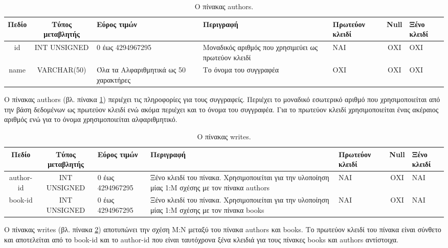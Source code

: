 \documentclass{assignment}
\begin{document}
\begin{landscape}
\begin{table}[htbp]
\begin{center}
  \begin{tabular}{|c|c|m{}|m{}|m{2.0cm}|c|m{1.5cm}|}
    \hline
    {\bf Πεδίο} & {\bf Τύπος μεταβλητής} & {\bf Εύρος τιμών} & {\bf Περιγραφή} & {\bf Πρωτεύον κλειδί} & {\bf Null} & {\bf Ξένο κλειδί} \\ \hline
    id & INT UNSIGNED & 0 έως 4294967295 & Μοναδικός αριθμός που χρησιμεύει ως πρωτεύον κλειδί & ΝΑΙ & ΟΧΙ & ΟΧΙ \\ \hline
    name & VARCHAR(50) & Όλα τα Αλφαριθμητικά ως 50 χαρακτήρες & Το όνομα του συγγραφέα & ΟΧΙ & ΟΧΙ & ΟΧΙ \\ \hline
  \end{tabular}
\caption{Ο πίνακας authors.}
\label{table:db_table:authors}
\end{center}
\end{table}

Ο πίνακας authors (βλ. πίνακα \ref{table:db_table:authors}) περιέχει τις πληροφορίες για τους συγγραφείς. Περιέχει το μοναδικό εσωτερικό αριθμό που χρησιμοποιείται από την βάση δεδομένων ως πρωτεύον κλειδί ενώ ακόμα περιέχει και το όνομα του συγγραφέα. Για το πρωτεύον κλειδί χρησιμοποιείται ένας ακέραιος αριθμός ενώ για το όνομα χρησιμοποιείται αλφαριθμητικό.
\\

\begin{table}[htbp]
\begin{center}
  \begin{tabular}{|c|c|m{}|m{}|m{2.0cm}|c|m{1.5cm}|}
    \hline
    {\bf Πεδίο} & {\bf Τύπος μεταβλητής} & {\bf Εύρος τιμών} & {\bf Περιγραφή} & {\bf Πρωτεύον κλειδί} & {\bf Null} & {\bf Ξένο κλειδί} \\ \hline
    author-id & INT UNSIGNED & 0 έως 4294967295 & Ξένο κλειδί του πίνακα. Χρησιμοποιείται για την υλοποίηση μίας 1:Μ σχέσης με τον πίνακα authors & ΝΑΙ & ΟΧΙ & NAI \\ \hline
    book-id & INT UNSIGNED & 0 έως 4294967295 & Ξένο κλειδί του πίνακα. Χρησιμοποιείται για την υλοποίηση μίας 1:Μ σχέσης με τον πίνακα books & ΝΑΙ & ΟΧΙ & NAI \\ \hline
  \end{tabular}
\caption{Ο πίνακας writes.}
\label{table:db_table:writes}
\end{center}
\end{table}

Ο πίνακας writes (βλ. πίνακα \ref{table:db_table:writes}) αποτυπώνει την σχέση Μ:Ν μεταξύ του πίνακα authors και books. Το πρωτεύον κλειδί του πίνακα είναι σύνθετο και αποτελείται από το book-id και το author-id που είναι ταυτόχρονα ξένα κλειδιά για τους πίνακες books και authors αντίστοιχα.

\end{landscape}
\end{document}
